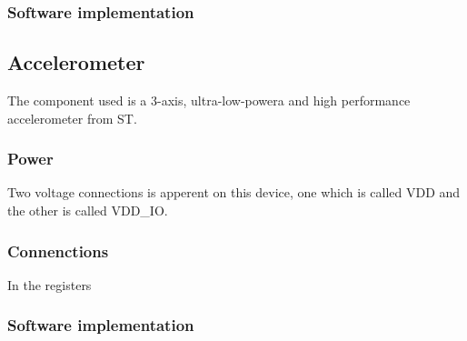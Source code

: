 \subsubsection{Software implementation}

\subsection{Accelerometer}
The component used is a 3-axis, ultra-low-powera and high performance accelerometer from ST\cite{STacc}.

\subsubsection{Power}
Two voltage connections is apperent on this device, one which is called VDD and the other is called VDD_IO. 

\subsubsection{Connenctions}
 In the registers 

\subsubsection{Software implementation}


